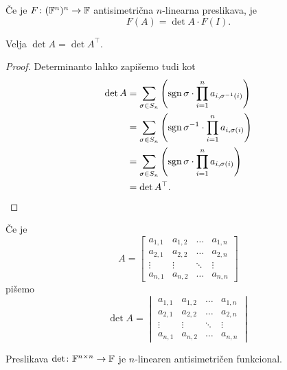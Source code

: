 \documentclass[12pt, a4paper]{article}
\begin{document}
\begin{opomba}
Če je $F\colon (\mathbb{F}^n)^n\to\mathbb{F}$ antisimetrična $n$-linearna preslikava, je
\[
F(A)=\det A\cdot F(I).
\]
\end{opomba}

\begin{trditev}
Velja $\det A=\det A^\top$.
\end{trditev}

\begin{proof}
Determinanto lahko zapišemo tudi kot
\begin{align*}
\det A&=\sum_{\sigma\in S_n} \left(\operatorname{sgn}\sigma\cdot\prod_{i=1}^n a_{i,\sigma^{-1}(i)}\right)
\\
&=\sum_{\sigma\in S_n} \left(\operatorname{sgn}\sigma^{-1}\cdot\prod_{i=1}^n a_{i,\sigma(i)}\right)
\\
&=\sum_{\sigma\in S_n} \left(\operatorname{sgn}\sigma\cdot\prod_{i=1}^n a_{i,\sigma(i)}\right)
\\
&=\det A^\top.\qedhere
\end{align*}
\end{proof}

\begin{opomba}
Če je
\[
A=\begin{bmatrix}
a_{1,1} & a_{1,2} & \dots  & a_{1,n} \\ 
a_{2,1} & a_{2,2} & \dots  & a_{2,n} \\ 
\vdots  & \vdots  & \ddots & \vdots \\ 
a_{n,1} & a_{n,2} & \dots  & a_{n,n}
\end{bmatrix} 
\]
pišemo
\[
\det A=\begin{vmatrix}
a_{1,1} & a_{1,2} & \dots  & a_{1,n} \\ 
a_{2,1} & a_{2,2} & \dots  & a_{2,n} \\ 
\vdots  & \vdots  & \ddots & \vdots \\ 
a_{n,1} & a_{n,2} & \dots  & a_{n,n}
\end{vmatrix} 
\]
\end{opomba}

\begin{izrek}
Preslikava $\det\colon\mathbb{F}^{n\times n}\to\mathbb{F}$ je $n$-linearen antisimetričen funkcional.
\end{izrek}

\obvs
\end{document}
